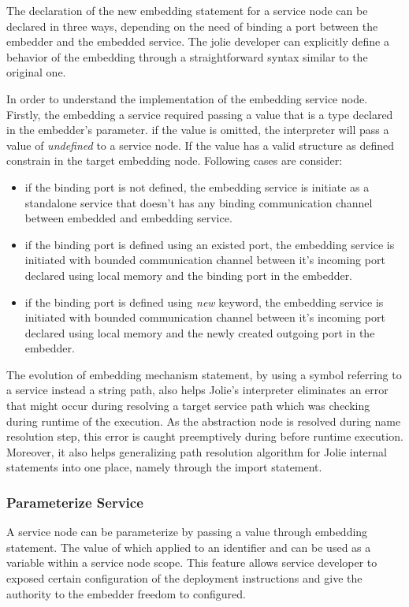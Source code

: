 The declaration of the new embedding statement for a service node can be declared in three ways, depending on the need of binding a port between the embedder and the embedded service. The jolie developer can explicitly define a behavior of the embedding through a straightforward syntax similar to the original one.

In order to understand the implementation of the embedding service node. Firstly, the embedding a service required passing a value that is a type declared in the embedder's parameter. if the value is omitted, the interpreter will pass a value of \textit{undefined} to a service node. If the value has a valid structure as defined constrain in the target embedding node. Following cases are consider:

\begin{itemize}
    \item if the binding port is not defined, the embedding service is initiate as a standalone service that doesn't has any binding communication channel between embedded and embedding service.
    \item if the binding port is defined using an existed port, the embedding service is initiated with bounded communication channel between it's incoming port declared using local memory and the binding port in the embedder.
    \item if the binding port is defined using \textit{new} keyword, the embedding service is initiated with bounded communication channel between it's incoming port declared using local memory and the newly created outgoing port in the embedder.
\end{itemize}

The evolution of embedding mechanism statement, by using a symbol referring to a service instead a string path, also helps Jolie's interpreter eliminates an error that might occur during resolving a target service path which was checking during runtime of the execution. As the abstraction node is resolved during name resolution step, this error is caught preemptively during before runtime execution. Moreover, it also helps generalizing path resolution algorithm for Jolie internal statements into one place, namely through the import statement.

\subsubsection{Parameterize Service}

A service node can be parameterize by passing a value through embedding statement. The value of which applied to an identifier and can be used as a variable within a service node scope. This feature allows service developer to exposed certain configuration of the deployment instructions and give the authority to the embedder freedom to configured. 

